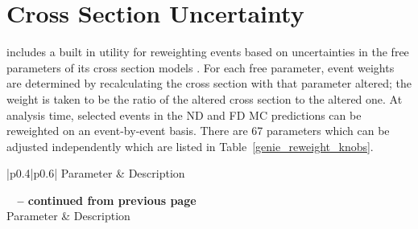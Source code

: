 \section{Cross Section Uncertainty}

\genie includes a built in utility for reweighting events based on
uncertainties in the free parameters of its cross section models
\cite{genie}.
For each free parameter, event weights are determined by recalculating the
cross section with that parameter altered;
the weight is taken to be the ratio of the altered cross section
to the altered one.
At analysis time, selected events in the ND and FD MC predictions can be
reweighted on an event-by-event basis.
There are 67 parameters which can be adjusted independently which are listed
in Table~\ref{genie_reweight_knobs}.

{
 \begin{longtable}{|p{0.4\linewidth}|p{0.6\linewidth}|}
\hline
Parameter & Description \\
\hline \hline
\endfirsthead

%
{{\bfseries \tablename\ \thetable{} -- continued from previous page}} \\
\hline
Parameter & Description \\
\hline \hline
\endhead

\hline \hline {} \\ \hline
\endfoot

\hline
\endlastfoot


\end{longtable}}
